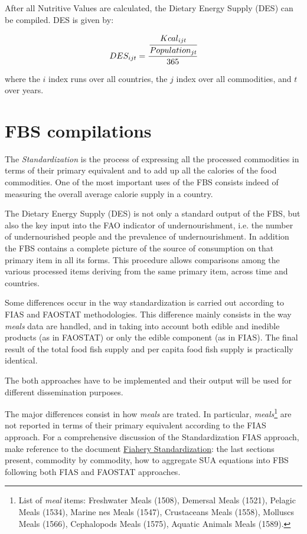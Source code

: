 \documentclass[nojss]{jss}
\begin{document}
After all Nutritive Values are calculated, the Dietary Energy Supply (DES) can be compiled. DES is given by:

\begin{equation}
\label{eq:des}
 DES_{ijt} = \cfrac{\cfrac{Kcal_{ijt}}{Population_{jt}}}{365}
\end{equation}

where the \(i\) index runs over all countries, the \(j\) index over all
commodities, and \(t\) over years.



\section{FBS compilations}

The \textit{Standardization} is the process of expressing all the
processed commodities in terms of their primary equivalent and to add up all the calories of the
food commodities. One of the most important uses of the FBS consists indeed of measuring the overall average calorie supply in a country. 

The Dietary Energy Supply (DES) is not only a standard output of the FBS, but also the key input into the FAO indicator of undernourishment, i.e. the number of undernourished people and the prevalence of undernourishment. 
In addition the FBS contains a complete picture of the source of consumption on that primary item in all its forms. This procedure allows comparisons among the various processed items deriving from the same primary item, across time and countries.


Some differences occur in the way standardization is carried out according to FIAS and FAOSTAT methodologies. This difference mainly consists in the way \textit{meals} data are handled, and in taking into account both edible and inedible products (as in FAOSTAT) or only the edible component (as in FIAS). The final result of the total food fish supply and per capita food fish supply is practically identical.  

The both approaches have to be implemented and their output will be used for different dissemination purposes.

The major differences consist in how \textit{meals} are trated. In particular, \textit{meals}\footnote{List of \textit{meal} items: Freshwater Meals (1508), Demersal Meals (1521), Pelagic Meals (1534), Marine nes Meals (1547), Crustaceans Meals (1558), Molluscs Meals (1566), Cephalopods Meals (1575), Aquatic Animals Meals (1589).} are not reported in terms of their primary equivalent according to the FIAS approach. For a comprehensive discussion of the Standardization FIAS approach, make reference to the document \href{https://unfao.sharepoint.com/:f:/s/pwa/SWS%20Phase%20III/EibKX3qrwsNAhKrHrkvTJgsBEu8Lb7NKyo5y52xl2CUXtg?e=0LuuC6}{Fiahery Standardization}: the last sections present, commodity by commodity, how to aggregate SUA equations into FBS following both FIAS and FAOSTAT approaches.
\end{document}
